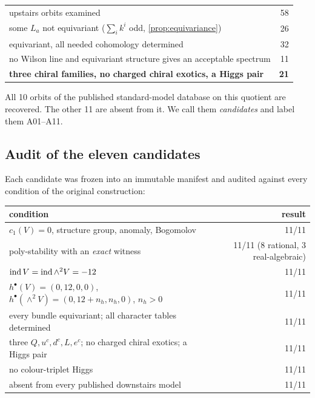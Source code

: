 \begin{center}\small
\begin{tabular}{@{}lr@{}}
\toprule
upstairs orbits examined & 58 \\
\quad some $L_a$ not equivariant ($\sum_ik^i$ odd, \cref{prop:equivariance}) & 26 \\
\quad equivariant, all needed cohomology determined & 32 \\
\qquad no Wilson line and equivariant structure gives an acceptable spectrum & 11 \\
\qquad \textbf{three chiral families, no charged chiral exotics, a Higgs pair} & \textbf{21} \\
\bottomrule
\end{tabular}
\end{center}

All 10 orbits of the published standard-model database on this quotient are
recovered. The other 11 are absent from it. We call them \emph{candidates} and
label them A01--A11.

\subsection{Audit of the eleven candidates}

Each candidate was frozen into an immutable manifest and audited against every
condition of the original construction:

\begin{center}\small
\begin{tabular}{@{}lr@{}}
\toprule
condition & result \\
\midrule
$c_1(V)=0$, structure group, anomaly, Bogomolov & 11/11 \\
poly-stability with an \emph{exact} witness & 11/11 (8 rational, 3 real-algebraic) \\
$\operatorname{ind} V=\operatorname{ind}\wedge^2V=-12$ & 11/11 \\
$h^\bullet(V)=(0,12,0,0)$, $h^\bullet(\wedge^2V)=(0,12+n_h,n_h,0)$, $n_h>0$ & 11/11 \\
every bundle equivariant; all character tables determined & 11/11 \\
three $Q,u^c,d^c,L,e^c$; no charged chiral exotics; a Higgs pair & 11/11 \\
no colour-triplet Higgs & 11/11 \\
absent from every published downstairs model & 11/11 \\
\bottomrule
\end{tabular}
\end{center}

